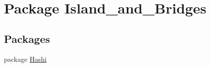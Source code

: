 \hypertarget{namespace_island__and___bridges}{}\section{Package Island\+\_\+and\+\_\+\+Bridges}
\label{namespace_island__and___bridges}
\subsection*{Packages}
\begin{DoxyCompactItemize}
\item 
package \mbox{\hyperlink{namespace_island__and___bridges_1_1_hashi}{Hashi}}
\end{DoxyCompactItemize}
